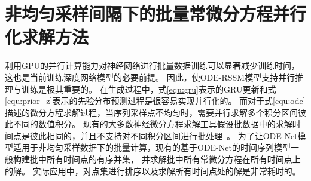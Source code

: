 \section{非均匀采样间隔下的批量常微分方程并行化求解方法}
\label{sec:5_parallel_ode_solve}
利用GPU的并行计算能力对神经网络进行批量数据训练可以显著减少训练时间，这也是当前训练深度网络模型的必要前提。
因此，使ODE-RSSM模型支持并行推理与训练是极其重要的。
在生成过程中，式\eqref{equ:gru}表示的GRU更新和式\eqref{equ:prior_z}表示的先验分布预测过程是很容易实现并行化的。
而对于式\eqref{equ:ode}描述的微分方程求解过程，当序列采样点不均匀时，需要并行求解多个积分区间彼此不同的数值积分。
现有的大多数神经微分方程求解工具假设批数据中的求解时间点是彼此相同的，并且不支持对不同积分区间进行批处理~\cite{kidger2021}。
为了让ODE-Net模型适用于非均匀采样数据下的批量计算，现有的基于ODE-Net的时间序列模型\cite{yildiz2021continuous,Rubanova2019}一般构建批中所有时间点的有序并集，
并求解批中所有常微分方程在所有时间点上的解。
实际应用中，对点集进行排序以及求解所有时间点处的解是非常耗时的。


